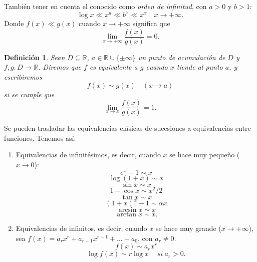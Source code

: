 \documentclass[12pt]{article}
\newtheorem{definition}[theorem]{Definición}
\begin{document}
También tener en cuenta el conocido como \textit{orden de infinitud}, con $a>0$ y $b>1$: $$\log x \ll x^a \ll b^x \ll x^x \quad x \rightarrow + \infty.$$ Donde $f(x) \ll g(x)$ cuando $x \rightarrow + \infty$ significa que $$\lim_{x \rightarrow + \infty} \dfrac{f(x)}{g(x)} = 0.$$

\begin{definition}Sean $D \subseteq \mathbb{R}$, $a \in \mathbb{R} \cup \lbrace \pm \infty \rbrace$ un punto de acumulación de $D$ y $f,g \colon D \rightarrow \mathbb{R}$. Diremos que $f$ es equivalente a $g$ cuando $x$ tiende al punto $a$, y escribiremos $$f(x) \sim g(x) \quad (x \rightarrow a)$$ si se cumple que $$\lim_{x \rightarrow x} \dfrac{f(x)}{g(x)} = 1.$$
\end{definition}

Se pueden trasladar las equivalencias clásicas de sucesiones a equivalencias entre funciones. Tenemos así: 
\begin{enumerate}
\item Equivalencias de infinitésimos, es decir, cuando $x$ se hace muy pequeño ($x \rightarrow 0$): 
$$e^x - 1 \sim x$$ $$\log (1+x) \sim x$$ $$\sin x \sim x$$ $$1 - \cos x \sim x^2/2$$ $$\tan x \sim x$$ $$(1+x)^\alpha - 1 \sim \alpha x$$ $$\arcsin x \sim x$$ $$\arctan x \sim x.$$
\item Equivalencias de infinitos, es decir, cuando $x$ se hace muy grande ($x \rightarrow +\infty$), sea $f(x) = a_rx^r + a_{r-1}x^{r-1} + \ldots + a_0$, con $a_r \neq 0$: $$f(x) \sim a_rx^r$$ $$\log f(x) \sim r\log x \quad~si~a_r>0.$$
\end{enumerate}
\end{document}
